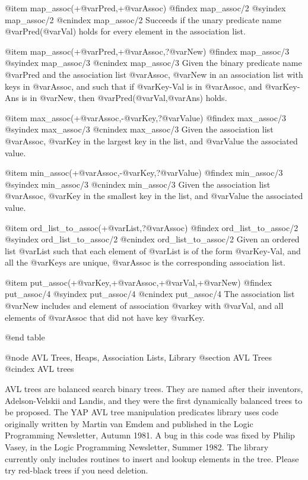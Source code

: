 {{{{{{{{{@item map_assoc(+@var{Pred},+@var{Assoc})
@findex map_assoc/2
@syindex map_assoc/2
@cnindex map_assoc/2
Succeeds if the unary predicate name @var{Pred}(@var{Val}) holds for every
element in the association list.

@item map_assoc(+@var{Pred},+@var{Assoc},?@var{New})
@findex map_assoc/3
@syindex map_assoc/3
@cnindex map_assoc/3
Given the binary predicate name @var{Pred} and the association list
@var{Assoc}, @var{New} in an association list with keys in @var{Assoc},
and such that if @var{Key-Val} is in @var{Assoc}, and @var{Key-Ans} is in
@var{New}, then @var{Pred}(@var{Val},@var{Ans}) holds.

@item max_assoc(+@var{Assoc},-@var{Key},?@var{Value})
@findex max_assoc/3
@syindex max_assoc/3
@cnindex max_assoc/3
Given the association list
@var{Assoc}, @var{Key} in the largest key in the list, and @var{Value}
the associated value.

@item min_assoc(+@var{Assoc},-@var{Key},?@var{Value})
@findex min_assoc/3
@syindex min_assoc/3
@cnindex min_assoc/3
Given the association list
@var{Assoc}, @var{Key} in the smallest key in the list, and @var{Value}
the associated value.

@item ord_list_to_assoc(+@var{List},?@var{Assoc})
@findex ord_list_to_assoc/2
@syindex ord_list_to_assoc/2
@cnindex ord_list_to_assoc/2
Given an ordered list @var{List} such that each element of @var{List} is
of the form @var{Key-Val}, and all the @var{Keys} are unique, @var{Assoc} is
the corresponding association list.

@item put_assoc(+@var{Key},+@var{Assoc},+@var{Val},+@var{New})
@findex put_assoc/4
@syindex put_assoc/4
@cnindex put_assoc/4
The association list @var{New} includes and element of association
@var{key} with @var{Val}, and all elements of @var{Assoc} that did not
have key @var{Key}.

@end table

@node AVL Trees, Heaps, Association Lists, Library
@section AVL Trees
@cindex AVL trees

AVL trees are balanced search binary trees. They are named after their
inventors, Adelson-Velskii and Landis, and they were the first
dynamically balanced trees to be proposed. The YAP AVL tree manipulation
predicates library uses code originally written by Martin van Emdem and
published in the Logic Programming Newsletter, Autumn 1981.  A bug in
this code was fixed by Philip Vasey, in the Logic Programming
Newsletter, Summer 1982. The library currently only includes routines to
insert and lookup elements in the tree. Please try red-black trees if
you need deletion.

}}}}}}}}}
